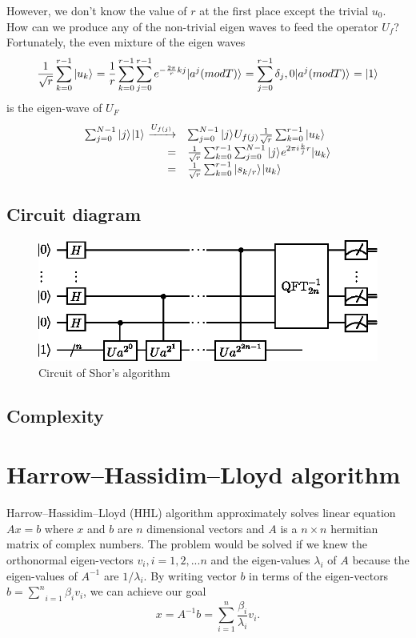 \documentclass[oneside, letter, 12pt]{book}
\begin{document}
However, we don't know the value of $r$ at the first place except the trivial $u_0$. How can we produce any of the non-trivial eigen waves to feed the operator $U_f$? Fortunately, the even mixture of the eigen waves
\begin{equation}\label{sum_u}
    \frac 1 {\sqrt{r}} \sum^{r-1}_{k=0}\vert {u_k} \rangle_{} = \frac 1 r \sum^{r-1}_{k=0} \sum^{r-1}_{j=0} e^{-{\frac {2\pi} r} kj} \vert {a^j (mod T)} \rangle_{} = \sum^{r-1}_{j=0} \delta_j,0 \vert {a^j (mod T)} \rangle_{} = \vert {1} \rangle_{}
\end{equation}
is the eigen-wave of $U_F$
\begin{equation}\label{ctrl_u}
\begin{array}{rl}
 \sum^{N-1}_{j=0} \vert {j} \rangle_{} \vert {1} \rangle_{} \xrightarrow{U_{f(j)}} & \sum^{N-1}_{j=0} \vert {j} \rangle_{} U_{f(j)} \frac 1 {\sqrt{r}} \sum^{r-1}_{k=0}\vert {u_k} \rangle_{}\\
    = & \frac 1 {\sqrt{r}} \sum^{r-1}_{k=0} \sum^{N-1}_{j=0} \vert {j} \rangle_{} e^{2\pi i \frac kj r} \vert {u_k} \rangle_{}\\
    = & \frac 1 {\sqrt{r}} \sum^{r-1}_{k=0} \vert {s_{k/r}} \rangle_{} \vert {u_k} \rangle_{}
\end{array}
\end{equation}

\subsection{Circuit diagram}
\begin{figure}[h]
\includegraphics[width=12cm]{pic/Shor_algorithm.eps}
\caption{Circuit of Shor's algorithm}
\label{ShorAlgorithm}
\end{figure}

\subsection{Complexity}

\section{Harrow–Hassidim–Lloyd algorithm}
Harrow–Hassidim–Lloyd (HHL) algorithm approximately solves linear equation $A x = b$ where $x$ and $b$ are $n$ dimensional vectors and $A$ is a $n \times n$ hermitian matrix of complex numbers. The problem would be solved if we knew the orthonormal eigen-vectors ${v_i}, i=1, 2, ...n$ and the eigen-values ${\lambda_i}$ of $A$ because the eigen-values of $A^{-1}$ are  ${1/\lambda_i}$. By writing vector $b$ in terms of the eigen-vectors $b = {\sum^n}_{i=1} \beta_i v_i$, we can achieve our goal
\begin{equation}
    x = A^{-1} b = \sum^{n}_{i=1} \frac {\beta_i} {\lambda_i} v_i .
\end{equation}
\end{document}
